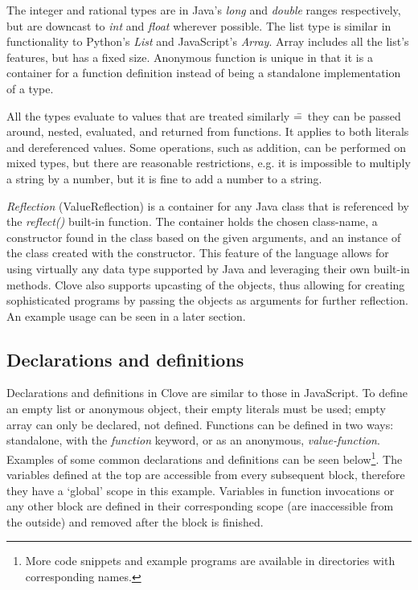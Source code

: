 \documentclass[12pt,a4paper]{article}
\begin{document}
\vspace{-0.075em}
\noindent The integer and rational types are in Java's \emph{long} and \emph{double} ranges respectively, but are downcast to \emph{int} and \emph{float} wherever possible. The list type is similar in functionality to Python's \emph{List} and JavaScript's \emph{Array}. Array includes all the list's features, but has a fixed size. Anonymous function is unique in that it is a container for a function definition instead of being a standalone implementation of a type.\par

All the types evaluate to values that are treated similarly \==~they can be passed around, nested, evaluated, and returned from functions. It applies to both literals and dereferenced values. Some operations, such as addition, can be performed on mixed types, but there are reasonable restrictions, e.g. it is impossible to multiply a string by a number, but it is fine to add a number to a string.\par

\emph{Reflection} (ValueReflection) is a container for any Java class that is referenced by the \emph{reflect()} built-in function. The container holds the chosen class-name, a constructor found in the class based on the given arguments, and an instance of the class created with the constructor. This feature of the language allows for using virtually any data type supported by Java and leveraging their own built-in methods. Clove also supports upcasting of the objects, thus allowing for creating sophisticated programs by passing the objects as arguments for further reflection. An example usage can be seen in a later section.



\subsection*{Declarations and definitions}
Declarations and definitions in Clove are similar to those in JavaScript. To define an empty list or anonymous object, their empty literals must be used; empty array can only be declared, not defined. Functions can be defined in two ways: standalone, with the \emph{function} keyword, or as an anonymous, \emph{value-function}. Examples of some common declarations and definitions can be seen below\footnote{More code snippets and example programs are available in directories with corresponding names.}. The variables defined at the top are accessible from every subsequent block, therefore they have a `global' scope in this example. Variables in function invocations or any other block are defined in their corresponding scope (are inaccessible from the outside) and removed after the block is finished.
\end{document}
